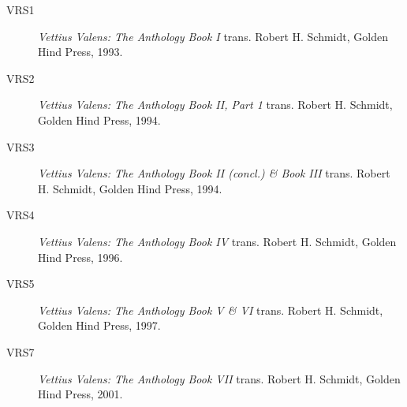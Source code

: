 \begin{description}
\item[VRS1] 
	\textsl{Vettius Valens: The Anthology Book I} trans. Robert H. Schmidt, Golden Hind Press, 1993.

\item[VRS2] 
	\textsl{Vettius Valens: The Anthology Book II, Part 1} trans. Robert H. Schmidt, Golden Hind Press, 1994.

\item[VRS3] 
	\textsl{Vettius Valens: The Anthology Book II (concl.) \& Book III} trans. Robert H. Schmidt, Golden Hind Press, 1994.

\item[VRS4] 
	\textsl{Vettius Valens: The Anthology Book IV} trans. Robert H. Schmidt, Golden Hind Press, 1996.

\item[VRS5] 
	\textsl{Vettius Valens: The Anthology Book V \& VI} trans. Robert H. Schmidt, Golden Hind Press, 1997.

\item[VRS7] 
	\textsl{Vettius Valens: The Anthology Book VII} trans. Robert H. Schmidt, Golden Hind Press, 2001.

\end{description}

\newpage
